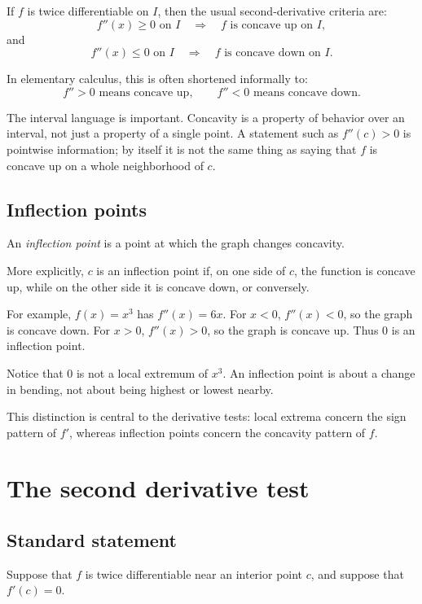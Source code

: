 \documentclass{essay}
\begin{document}
If \(f\) is twice differentiable on \(I\), then the usual second-derivative criteria are:
\[
f''(x)\geq0\text{ on }I
\quad\Longrightarrow\quad
f\text{ is concave up on }I,
\]
and
\[
f''(x)\leq0\text{ on }I
\quad\Longrightarrow\quad
f\text{ is concave down on }I.
\]

In elementary calculus, this is often shortened informally to:
\[
f''>0 \text{ means concave up},
\qquad
f''<0 \text{ means concave down}.
\]

The interval language is important. Concavity is a property of behavior over an interval, not just a property of a single point. A statement such as \(f''(c)>0\) is pointwise information; by itself it is not the same thing as saying that \(f\) is concave up on a whole neighborhood of \(c\).

\subsection{Inflection points}

An \emph{inflection point} is a point at which the graph changes concavity.

More explicitly, \(c\) is an inflection point if, on one side of \(c\), the function is concave up, while on the other side it is concave down, or conversely.

For example, \(f(x)=x^3\) has \(f''(x)=6x\). For \(x<0\), \(f''(x)<0\), so the graph is concave down. For \(x>0\), \(f''(x)>0\), so the graph is concave up. Thus \(0\) is an inflection point.

Notice that \(0\) is not a local extremum of \(x^3\). An inflection point is about a change in bending, not about being highest or lowest nearby.

This distinction is central to the derivative tests: local extrema concern the sign pattern of \(f'\), whereas inflection points concern the concavity pattern of \(f\).

\section{The second derivative test}

\subsection{Standard statement}

Suppose that \(f\) is twice differentiable near an interior point \(c\), and suppose that \(f'(c)=0\).
\end{document}
